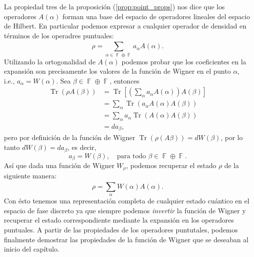 \documentclass[a4paper]{report}
\DeclareMathOperator{\F}{\mathbb{F}}
\DeclareMathOperator{\Tr}{Tr}
\begin{document}
  La propiedad tres de la proposición
  (\ref{prop:point_props}) nos dice que los operadores
  $A(\alpha)$ forman una base del espacio de operadores
  lineales del espacio de Hilbert. En particular podemos
  expresar a cualquier operador de densidad en términos de
  los operadres puntuales:
  \begin{equation}
    \rho = \sum_{\alpha \in \F \oplus \F}^{}
    a_\alpha A(\alpha).
  \end{equation} 
  Utilizando la ortogonalidad de $A(\alpha)$ podemos probar
  que los coeficientes en la expansión son precisamente los
  valores de la función de Wigner en el punto $\alpha$,
  i.e., $a_\alpha = W(\alpha)$. Sea $\beta \in \F \oplus
  \F$, entonces
  \begin{align}
    \Tr(\rho A(\beta))
    &= \Tr\left[
      \left(\sum_{\alpha}^{} a_\alpha A(\alpha)\right)
      A(\beta)
    \right] \\
    &= \sum_{\alpha}^{} \Tr\left(
      a_\alpha A(\alpha) A(\beta)
    \right) \\
    &= \sum_{\alpha}^{} a_\alpha \Tr(A(\alpha)A(\beta)) \\
    &= d a_\beta,
  \end{align}
  pero por definición de la función de Wigner
  $\Tr(\rho(A\beta)) = d W(\beta)$, por lo tanto $dW(\beta)
  = d a_\beta$, es decir,
  \begin{equation}
    a_\beta = W(\beta),
    \quad
    \text{para todo } \beta \in \F \oplus \F.
  \end{equation}
  Así que dada una función de Wigner $W_\rho$, podemos
  recuperar el estado $\rho$ de la siguiente manera:
  \begin{equation}
    \rho = \sum_{\alpha}^{} W(\alpha) A(\alpha).
  \end{equation} 
  Con ésto tenemos una representación completa de cualquier
  estado cuántico en el espacio de fase discreto ya que
  siempre podemos \textit{invertir} la función de Wigner y
  recuperar el estado correspondiente mediante la expansión
  en los operadores puntuales. A partir de las propiedades
  de los operadores puntutales, podemos finalmente demostrar
  las propiedades de la función de Wigner que se deseaban al
  inicio del capítulo.
\end{document}
